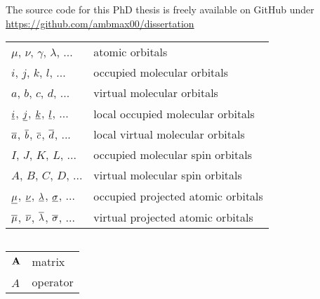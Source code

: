 \documentclass[a4paper,12pt]{report}
\begin{document}
{The source code for this PhD thesis is freely available on GitHub under \url{https://github.com/ambmax00/dissertation}}

\newpage

\newpage


{
\setlength{\tabcolsep}{14pt}
\renewcommand{\arraystretch}{1.5}
\begin{longtable}[l]{ll}
$\mu$, $\nu$, $\gamma$, $\lambda$, ... & atomic orbitals \\
$i$, $j$, $k$, $l$, ... & occupied molecular orbitals \\
$a$, $b$, $c$, $d$, ... & virtual molecular orbitals \\
$\underline{i}$, $\underline{j}$, $\underline{k}$, $\underline{l}$, ... & local occupied molecular orbitals \\
$\overline{a}$, $\overline{b}$, $\overline{c}$, $\overline{d}$, ... & local virtual molecular orbitals \\
$I$, $J$, $K$, $L$, ... & occupied molecular spin orbitals \\
$A$, $B$, $C$, $D$, ... & virtual molecular spin orbitals \\
$\underline{\mu}$, $\underline{\nu}$, $\underline{\lambda}$, $\underline{\sigma}$, ... & occupied projected atomic orbitals \\
$\overline{\mu}$, $\overline{\nu}$, $\overline{\lambda}$, $\overline{\sigma}$, ... & virtual projected atomic orbitals
\end{longtable}
}

\vspace{0.5cm}

{
\setlength{\tabcolsep}{14pt}
\renewcommand{\arraystretch}{1.5}
\begin{longtable}[l]{ll}

\end{longtable}
}


{
\setlength{\tabcolsep}{14pt}
\renewcommand{\arraystretch}{1.5}
\begin{longtable}[l]{ll}
$\mathbf{A}$ & matrix \\
$\hat{A}$ & operator \\
\end{longtable}
}

\newpage



\setcounter{tocdepth}{2}
\tableofcontents

\newpage
\end{document}
